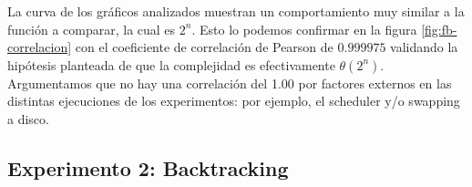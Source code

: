 \documentclass[10pt,a4paper]{article}
\begin{document}
\newline
La curva de los gráficos analizados muestran un comportamiento muy similar a la función a comparar, la cual es $2^{n}$. Esto lo podemos confirmar en la figura \ref{fig:fb-correlacion} con el
coeficiente de correlación de Pearson\cite{ref:pearson} de $0.999975$ validando la hipótesis planteada de que la complejidad es efectivamente $\theta(2^n)$. Argumentamos que no hay una correlación del 1.00 por factores externos en las distintas ejecuciones de los experimentos: por ejemplo, el scheduler y/o swapping a disco.
\newpage
\subsection{Experimento 2: Backtracking}
\end{document}
